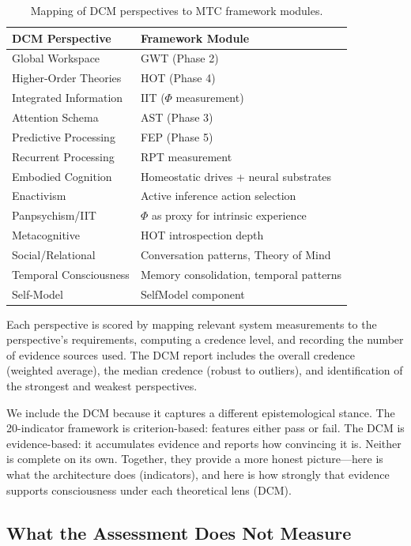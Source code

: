 \begin{table}[t]
\centering
\begin{tabular}{ll}
\toprule
\textbf{DCM Perspective} & \textbf{Framework Module} \\
\midrule
Global Workspace & GWT (Phase 2) \\
Higher-Order Theories & HOT (Phase 4) \\
Integrated Information & IIT ($\Phi$ measurement) \\
Attention Schema & AST (Phase 3) \\
Predictive Processing & FEP (Phase 5) \\
Recurrent Processing & RPT measurement \\
Embodied Cognition & Homeostatic drives + neural substrates \\
Enactivism & Active inference action selection \\
Panpsychism/IIT & $\Phi$ as proxy for intrinsic experience \\
Metacognitive & HOT introspection depth \\
Social/Relational & Conversation patterns, Theory of Mind \\
Temporal Consciousness & Memory consolidation, temporal patterns \\
Self-Model & SelfModel component \\
\bottomrule
\end{tabular}
\caption{Mapping of DCM perspectives to MTC framework modules.}
\label{tab:dcm-mapping}
\end{table}

Each perspective is scored by mapping relevant system measurements to the perspective's requirements, computing a credence level, and recording the number of evidence sources used. The DCM report includes the overall credence (weighted average), the median credence (robust to outliers), and identification of the strongest and weakest perspectives.

We include the DCM because it captures a different epistemological stance. The 20-indicator framework is criterion-based: features either pass or fail. The DCM is evidence-based: it accumulates evidence and reports how convincing it is. Neither is complete on its own. Together, they provide a more honest picture---here is what the architecture does (indicators), and here is how strongly that evidence supports consciousness under each theoretical lens (DCM).

\subsection{What the Assessment Does Not Measure}

